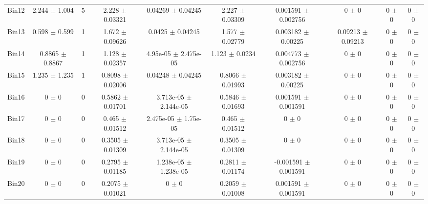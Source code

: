 \begin{tabular}{@{\extracolsep{4pt}}lccccccccc@{}}
     Bin12 & 2.244 $\pm$ 1.004 & 5 & 2.228 $\pm$ 0.03321 & 0.04269 $\pm$ 0.04245 & 2.227 $\pm$ 0.03309 & 0.001591 $\pm$ 0.002756 & 0 $\pm$ 0 & 0 $\pm$ 0 & 0 $\pm$ 0 \\ 
     Bin13 & 0.598 $\pm$ 0.599 & 1 & 1.672 $\pm$ 0.09626 & 0.0425 $\pm$ 0.04245 & 1.577 $\pm$ 0.02779 & 0.003182 $\pm$ 0.00225 & 0.09213 $\pm$ 0.09213 & 0 $\pm$ 0 & 0 $\pm$ 0 \\ 
     Bin14 & 0.8865 $\pm$ 0.8867 & 1 & 1.128 $\pm$ 0.02357 & 4.95e-05 $\pm$ 2.475e-05 & 1.123 $\pm$ 0.0234 & 0.004773 $\pm$ 0.002756 & 0 $\pm$ 0 & 0 $\pm$ 0 & 0 $\pm$ 0 \\ 
     Bin15 & 1.235 $\pm$ 1.235 & 1 & 0.8098 $\pm$ 0.02006 & 0.04248 $\pm$ 0.04245 & 0.8066 $\pm$ 0.01993 & 0.003182 $\pm$ 0.00225 & 0 $\pm$ 0 & 0 $\pm$ 0 & 0 $\pm$ 0 \\ 
     Bin16 & 0 $\pm$ 0 & 0 & 0.5862 $\pm$ 0.01701 & 3.713e-05 $\pm$ 2.144e-05 & 0.5846 $\pm$ 0.01693 & 0.001591 $\pm$ 0.001591 & 0 $\pm$ 0 & 0 $\pm$ 0 & 0 $\pm$ 0 \\ 
     Bin17 & 0 $\pm$ 0 & 0 & 0.465 $\pm$ 0.01512 & 2.475e-05 $\pm$ 1.75e-05 & 0.465 $\pm$ 0.01512 & 0 $\pm$ 0 & 0 $\pm$ 0 & 0 $\pm$ 0 & 0 $\pm$ 0 \\ 
     Bin18 & 0 $\pm$ 0 & 0 & 0.3505 $\pm$ 0.01309 & 3.713e-05 $\pm$ 2.144e-05 & 0.3505 $\pm$ 0.01309 & 0 $\pm$ 0 & 0 $\pm$ 0 & 0 $\pm$ 0 & 0 $\pm$ 0 \\ 
     Bin19 & 0 $\pm$ 0 & 0 & 0.2795 $\pm$ 0.01185 & 1.238e-05 $\pm$ 1.238e-05 & 0.2811 $\pm$ 0.01174 & -0.001591 $\pm$ 0.001591 & 0 $\pm$ 0 & 0 $\pm$ 0 & 0 $\pm$ 0 \\ 
     Bin20 & 0 $\pm$ 0 & 0 & 0.2075 $\pm$ 0.01021 & 0 $\pm$ 0 & 0.2059 $\pm$ 0.01008 & 0.001591 $\pm$ 0.001591 & 0 $\pm$ 0 & 0 $\pm$ 0 & 0 $\pm$ 0 \\ 
\hline\hline
  \end{tabular}
